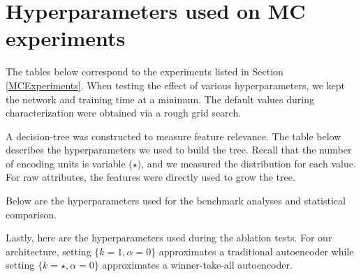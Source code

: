 


\newpage
\section*{Hyperparameters used on MC experiments}
\par The tables below correspond to the experiments listed in Section
\ref{MCExperiments}. When testing the effect of various hyperparameters, we
kept the network and training time at a minimum. The default values during
characterization were obtained via a rough grid search.



\par A decision-tree was constructed to measure feature relevance.  The table
below describes the hyperparameters we used to build the tree.  Recall that the
number of encoding units is variable ($\star$), and we measured the
distribution for each value. For raw attributes, the features were directly
used to grow the tree.



\par Below are the hyperparameters used for the benchmark analyses and
statistical comparison. 




\par Lastly, here are the hyperparameters used during the ablation tests. For
our architecture, setting $\{k=1, \alpha=0\}$ approximates a traditional
autoencoder while setting $\{k=\star, \alpha=0\}$ approximates a
winner-take-all autoencoder.



